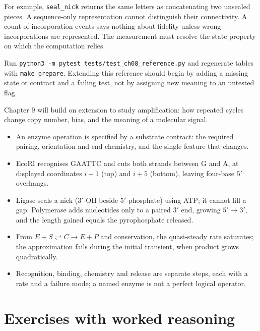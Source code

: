 For example, \texttt{seal\_nick} returns the same letters as concatenating two unsealed pieces. A sequence-only representation cannot distinguish their connectivity. A count of incorporation events says nothing about fidelity unless wrong incorporations are represented. The measurement must resolve the state property on which the computation relies.

Run \texttt{python3 -m pytest tests/test\_ch08\_reference.py} and regenerate tables with \texttt{make prepare}. Extending this reference should begin by adding a missing state or contract and a failing test, not by assigning new meaning to an untested flag.

Chapter 9 will build on extension to study amplification: how repeated cycles change copy number, bias, and the meaning of a molecular signal.

\begin{KeyIdeas}
\begin{itemize}\setlength{\itemsep}{2pt}
\item An enzyme operation is specified by a substrate contract: the required
pairing, orientation and end chemistry, and the single feature that changes.
\item EcoRI recognises GAATTC and cuts both strands between G and A, at displayed
coordinates $i+1$ (top) and $i+5$ (bottom), leaving four-base $5'$ overhangs.
\item Ligase seals a nick ($3'$-OH beside $5'$-phosphate) using ATP; it cannot fill a
gap. Polymerase adds nucleotides only to a paired $3'$ end, growing $5'\to3'$, and
the length gained equals the pyrophosphate released.
\item From $E+S\rightleftharpoons C\to E+P$ and conservation, the quasi-steady
rate saturates; the approximation fails during the initial transient, when
product grows quadratically.
\item Recognition, binding, chemistry and release are separate steps, each with
a rate and a failure mode; a named enzyme is not a perfect logical operator.
\end{itemize}
\end{KeyIdeas}

\section{Exercises with worked reasoning}

